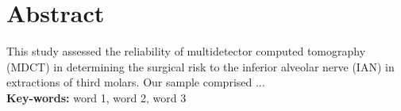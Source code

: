 \section{Abstract}
\noindent %
This study assessed the reliability of multidetector computed
tomography (MDCT) in determining the surgical risk to the inferior
alveolar nerve (IAN) in extractions of third molars. Our sample comprised  ... \\ %

\noindent \textbf{Key-words:}
word 1, word 2, word 3